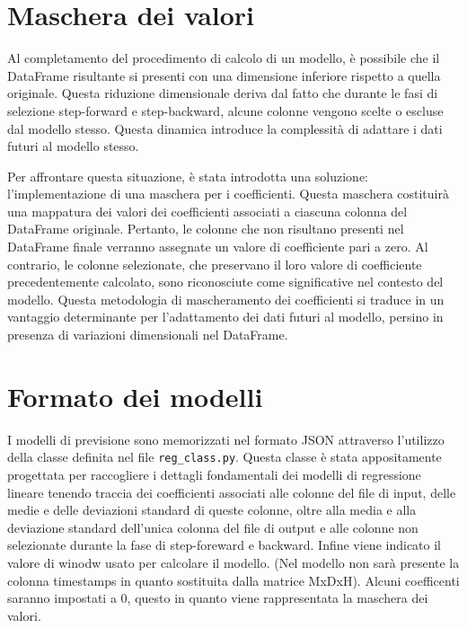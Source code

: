 \documentclass{rapportECL}
\begin{document}
\section{Maschera dei valori}

Al completamento del procedimento di calcolo di un modello, è possibile che il DataFrame risultante si presenti con una dimensione inferiore rispetto
a quella originale. Questa riduzione dimensionale deriva dal fatto che durante le fasi di selezione step-forward e step-backward, alcune colonne vengono 
scelte o escluse dal modello stesso. Questa dinamica introduce la complessità di adattare i dati futuri al modello stesso.

Per affrontare questa situazione, è stata introdotta una soluzione: l'implementazione di una maschera per i coefficienti. 
Questa maschera costituirà una mappatura dei valori dei coefficienti associati a ciascuna colonna del DataFrame originale. 
Pertanto, le colonne che non risultano presenti nel DataFrame finale verranno assegnate un valore di coefficiente pari a zero. Al contrario, le colonne 
selezionate, che preservano il loro valore di coefficiente precedentemente calcolato, sono riconosciute come significative nel contesto del modello. 
Questa metodologia di mascheramento dei coefficienti si traduce in un vantaggio determinante per l'adattamento dei dati futuri al modello, 
persino in presenza di variazioni dimensionali nel DataFrame.

\section{Formato dei modelli}

I modelli di previsione sono memorizzati nel formato JSON attraverso l'utilizzo della classe definita nel file \texttt{reg\_class.py}.
Questa classe è stata appositamente progettata per raccogliere i dettagli fondamentali dei modelli di regressione lineare 
tenendo traccia dei coefficienti associati alle colonne del file di input, delle medie e delle deviazioni standard di queste colonne, 
oltre alla media e alla deviazione standard dell'unica colonna del file di output e alle colonne non selezionate durante la fase di step-foreward
e backward. Infine viene indicato il valore di winodw usato per calcolare il modello.
(Nel modello non sarà presente la colonna timestamps in quanto sostituita dalla matrice MxDxH). Alcuni coefficenti saranno impostati a 0, 
questo in quanto viene rappresentata la maschera dei valori.
\end{document}
